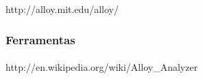 http://alloy.mit.edu/alloy/
\subsubsection{Ferramentas}
\paragraph{}
http://en.wikipedia.org/wiki/Alloy_Analyzer
